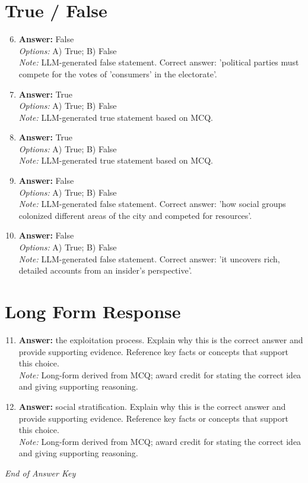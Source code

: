 \documentclass[12pt]{article}
\begin{document}
\section*{True / False}
\begin{enumerate}[label=\arabic*.]
\setcounter{enumi}{5}
\item \textbf{Answer:} False
\\ \textit{Options:} A) True; B) False
\\ \textit{Note:} LLM-generated false statement. Correct answer: 'political parties must compete for the votes of 'consumers' in the electorate'.
\item \textbf{Answer:} True
\\ \textit{Options:} A) True; B) False
\\ \textit{Note:} LLM-generated true statement based on MCQ.
\item \textbf{Answer:} True
\\ \textit{Options:} A) True; B) False
\\ \textit{Note:} LLM-generated true statement based on MCQ.
\item \textbf{Answer:} False
\\ \textit{Options:} A) True; B) False
\\ \textit{Note:} LLM-generated false statement. Correct answer: 'how social groups colonized different areas of the city and competed for resources'.
\item \textbf{Answer:} False
\\ \textit{Options:} A) True; B) False
\\ \textit{Note:} LLM-generated false statement. Correct answer: 'it uncovers rich, detailed accounts from an insider's perspective'.
\end{enumerate}

\section*{Long Form Response}
\begin{enumerate}[label=\arabic*.]
\setcounter{enumi}{10}
\item \textbf{Answer:} the exploitation process. Explain why this is the correct answer and provide supporting evidence. Reference key facts or concepts that support this choice.
\\ \textit{Note:} Long-form derived from MCQ; award credit for stating the correct idea and giving supporting reasoning.
\item \textbf{Answer:} social stratification. Explain why this is the correct answer and provide supporting evidence. Reference key facts or concepts that support this choice.
\\ \textit{Note:} Long-form derived from MCQ; award credit for stating the correct idea and giving supporting reasoning.
\end{enumerate}

\vfill
\noindent\textit{End of Answer Key}
\end{document}
